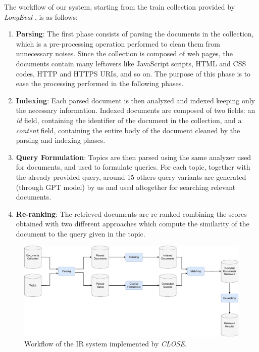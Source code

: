 The workflow of our system, starting from the train collection provided by \textit{LongEval} \cite{cleflongeval}, is as follows:
\begin{enumerate}
    \item \textbf{Parsing}: The first phase consists of parsing the documents in the collection, which is a pre-processing operation performed to clean them from unnecessary noises. Since the collection is composed of web pages, the documents contain many leftovers like JavaScript scripts, HTML and CSS codes, HTTP and HTTPS URIs, and so on. The purpose of this phase is to ease the processing performed in the following phases.

    \item \textbf{Indexing}: Each parsed document is then analyzed and indexed keeping only the necessary information. Indexed documents are composed of two fields: an \textit{id} field, containing the identifier of the document in the collection, and a \textit{content} field, containing the entire body of the document cleaned by the parsing and indexing phases.

    \item \textbf{Query Formulation}: Topics are then parsed using the same analyzer used for documents, and used to formulate queries. For each topic, together with the already provided query, around 15 others query variants are generated (through GPT model) by us and used altogether for searching relevant documents.

    \item \textbf{Re-ranking}: The retrieved documents are re-ranked combining the scores obtained with two different approaches which compute the similarity of the document to the query given in the topic.

\end{enumerate}

\begin{figure}[!h]
    \centering
    \includegraphics[width=\textwidth, height=\textheight, keepaspectratio]{figure/CLOSE_IR_Workflow (2).pdf}
    \caption{Workflow of the IR system implemented by \textit{CLOSE}.}
    \label{fig:CLOSE_IR_Workflow}
\end{figure}

